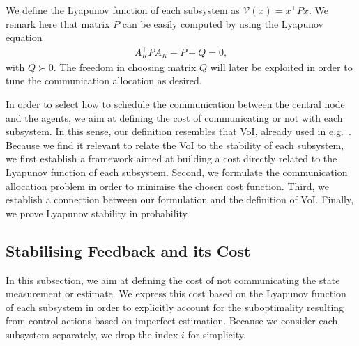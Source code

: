 \documentclass[letterpaper, 10 pt, conference]{ieeeconf}  %
\newcommand{\themis}[1]{
		\begin{center}
			\fcolorbox{themis}{themis}{\parbox[t]{0.9\linewidth}{\textbf{Themis:} #1}}
	\end{center}}
\newcommand{\mario}[1]{
	\begin{center}
		\fcolorbox{mario}{mario}{\parbox[t]{0.9\linewidth}{\textbf{Mario:} #1}}
	\end{center}}
\begin{document}
We define the Lyapunov function of each subsystem as $\mathcal{V}(x) = x^\top P x$. %
We remark here that matrix $P$ can be easily computed by using the Lyapunov equation
\begin{align}
\label{eq:lyap}
A_K^\top P A_K - P + Q = 0,
\end{align}
with $Q \succ 0$. The freedom in choosing matrix $Q$ will later be exploited in order to tune the communication allocation as desired.


In order to select how to schedule the communication between the central node and the agents, we aim at defining the cost of communicating or not with each subsystem. In this sense, our definition resembles that VoI, already used in e.g.~\cite{Molin2015,Soleymani2016}. Because we find it relevant to relate the VoI to the stability of each subsystem, we first establish a framework aimed at building a cost directly related to the Lyapunov function of each subsystem. Second, we formulate the communication allocation problem in order to minimise the chosen cost function. Third, we establish a connection between our formulation and the definition of VoI. Finally, we prove Lyapunov stability in probability.

\subsection{Stabilising Feedback and its Cost}\label{subsec:LQG}

In this subsection, we aim at defining the cost of not communicating the state measurement or estimate. %
We express this cost based on the Lyapunov function of each subsystem in order to explicitly account for the suboptimality resulting from control actions based on imperfect estimation.
Because we consider each subsystem separately, we drop the index $i$ for simplicity.
\end{document}
